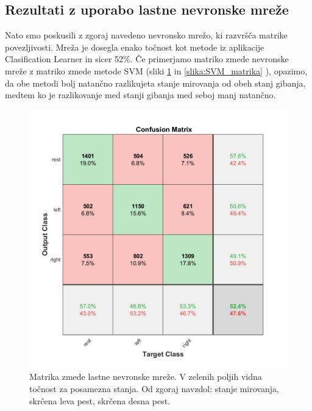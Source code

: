 \subsection{Rezultati z uporabo lastne nevronske mreže}
Nato smo poskusili z zgoraj navedeno nevronsko mrežo, ki razvršča matrike povezljivosti. Mreža je dosegla enako točnost kot metode iz aplikacije Clasification Learner in sicer 52\%. Če primerjamo matriko zmede nevronske mreže z matriko zmede metode SVM (sliki \ref{slika:nevronska_mreza_matrika} in \ref{slika:SVM_matrika} ), opazimo, da obe metodi bolj natančno razlikujeta stanje mirovanja od obeh stanj gibanja, medtem ko je razlikovanje med stanji gibanja med seboj manj natančno.

\begin{figure}
\begin{center}
\includegraphics[width=0.8\linewidth]{slike/Confusion_13-20Hz_0s-4s.png}
\end{center}
\caption[Matrika zmede lastne nevronske mreže.]{Matrika zmede lastne nevronske mreže. V zelenih poljih vidna točnost za posamezna stanja. Od zgoraj navzdol: stanje mirovanja, skrčena leva pest, skrčena desna pest.}
\label{slika:nevronska_mreza_matrika}
\end{figure}




